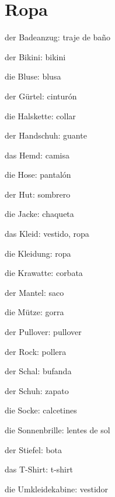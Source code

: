 \section{Ropa}
\begin{multicols}{3}
\begin{myitemize}
\item der Badeanzug: traje de baño
\item der Bikini: bikini
\item die Bluse: blusa
\item der Gürtel: cinturón
\item die Halskette: collar
\item der Handschuh: guante
\item das Hemd: camisa
\item die Hose: pantalón
\item der Hut: sombrero
\item die Jacke: chaqueta
\item das Kleid: vestido, ropa
\item die Kleidung: ropa
\item die Krawatte: corbata
\item der Mantel: saco
\item die Mütze: gorra
\item der Pullover: pullover
\item der Rock: pollera
\item der Schal: bufanda
\item der Schuh: zapato
\item die Socke: calcetines
\item die Sonnenbrille: lentes de sol
\item der Stiefel: bota
\item das T-Shirt: t-shirt
\item die Umkleidekabine: vestidor
\end{myitemize}
\end{multicols}

